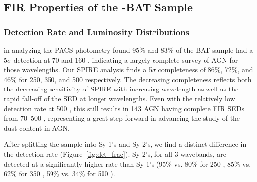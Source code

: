 \subsection{FIR Properties of the \herschel-BAT Sample }
\subsubsection{Detection Rate and Luminosity Distributions}\label{sec:det_rate_lum_dist}
\citet{Melendez:2014yu} in analyzing the PACS photometry found 95\% and 83\% of the BAT sample had a 5$\sigma$ detection at 70 and 160 \um, indicating a largely complete survey of AGN for those wavelengths. Our SPIRE analysis finds a 5$\sigma$ completeness of 86\%, 72\%, and 46\% for 250, 350, and 500 \um{} respectively. The decreasing completeness reflects both the decreasing sensitivity of SPIRE with increasing wavelength as well as the rapid fall-off of the SED at longer wavelengths. Even with the relatively low detection rate at 500 \um, this still results in 143 AGN having complete FIR SEDs from 70--500 \um, representing a great step forward in advancing the study of the dust content in AGN. 

After splitting the sample into Sy 1's and Sy 2's, we find a distinct difference in the detection rate (Figure~\ref{fig:det_frac}). Sy 2's, for all 3 wavebands, are detected at a significantly higher rate than Sy 1's (95\% vs. 80\% for 250 \um, 85\% vs. 62\% for 350 \um, 59\% vs. 34\% for 500 \um).